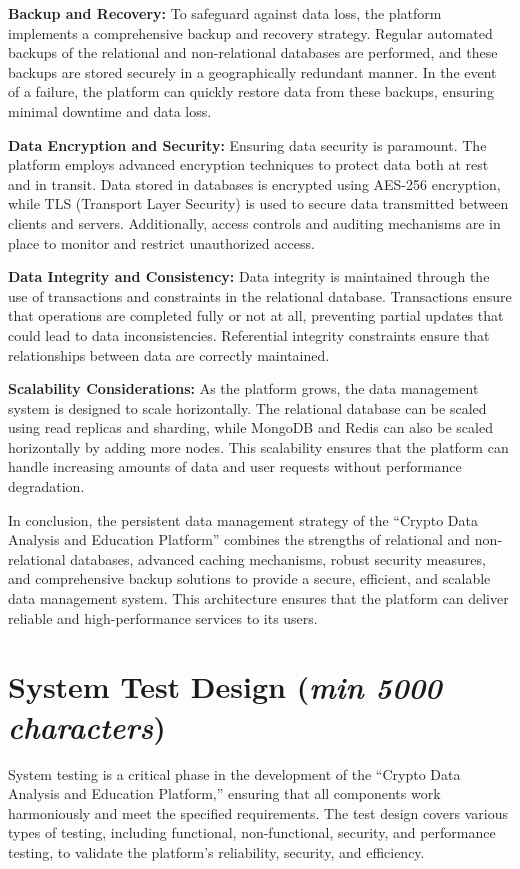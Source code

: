 \documentclass[12pt]{report}
\newcommand{\characters}[1]{(\textit{min #1 characters})}
\begin{document}
\textbf{Backup and Recovery:} To safeguard against data loss, the platform implements a comprehensive backup and recovery strategy. Regular automated backups of the relational and non-relational databases are performed, and these backups are stored securely in a geographically redundant manner. In the event of a failure, the platform can quickly restore data from these backups, ensuring minimal downtime and data loss.

\textbf{Data Encryption and Security:} Ensuring data security is paramount. The platform employs advanced encryption techniques to protect data both at rest and in transit. Data stored in databases is encrypted using AES-256 encryption, while TLS (Transport Layer Security) is used to secure data transmitted between clients and servers. Additionally, access controls and auditing mechanisms are in place to monitor and restrict unauthorized access.

\textbf{Data Integrity and Consistency:} Data integrity is maintained through the use of transactions and constraints in the relational database. Transactions ensure that operations are completed fully or not at all, preventing partial updates that could lead to data inconsistencies. Referential integrity constraints ensure that relationships between data are correctly maintained.

\textbf{Scalability Considerations:} As the platform grows, the data management system is designed to scale horizontally. The relational database can be scaled using read replicas and sharding, while MongoDB and Redis can also be scaled horizontally by adding more nodes. This scalability ensures that the platform can handle increasing amounts of data and user requests without performance degradation.

In conclusion, the persistent data management strategy of the “Crypto Data Analysis and Education Platform” combines the strengths of relational and non-relational databases, advanced caching mechanisms, robust security measures, and comprehensive backup solutions to provide a secure, efficient, and scalable data management system. This architecture ensures that the platform can deliver reliable and high-performance services to its users.

\section{System Test Design \characters{5000}}
System testing is a critical phase in the development of the ``Crypto Data Analysis and Education Platform,'' ensuring that all components work harmoniously and meet the specified requirements. The test design covers various types of testing, including functional, non-functional, security, and performance testing, to validate the platform's reliability, security, and efficiency.
\end{document}
